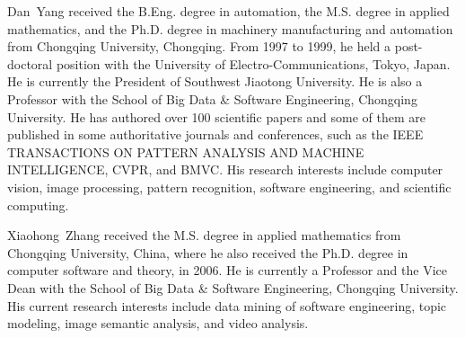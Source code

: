 \documentclass[journal]{IEEEtran}
\begin{document}
\begin{IEEEbiography}{Dan~Yang}
    received the B.Eng. degree in automation, the M.S. degree in applied mathematics, and the Ph.D. degree in machinery manufacturing and automation from Chongqing University, Chongqing. From 1997 to 1999, he held a post-doctoral position with the University of Electro-Communications, Tokyo, Japan. He is currently the President of Southwest Jiaotong University. He is also a Professor with the School of Big Data \& Software Engineering, Chongqing University. He has authored over 100 scientific papers and some of them are published in some authoritative journals and conferences, such as the IEEE TRANSACTIONS ON PATTERN ANALYSIS AND MACHINE INTELLIGENCE, CVPR, and BMVC. His research interests include computer vision, image processing, pattern recognition, software engineering,
and scientific computing.
\end{IEEEbiography}
\vspace{-0.5cm}

\begin{IEEEbiography}{Xiaohong~Zhang}
    received the M.S. degree in applied mathematics from Chongqing University, China, where he also received the Ph.D. degree in computer software and theory, in 2006. He is currently a Professor and the Vice Dean with the School of Big Data \& Software Engineering, Chongqing University. His current research interests include data mining of software engineering, topic modeling, image semantic analysis, and video analysis.
\end{IEEEbiography}
\vspace{-0.5cm}

\end{document}
